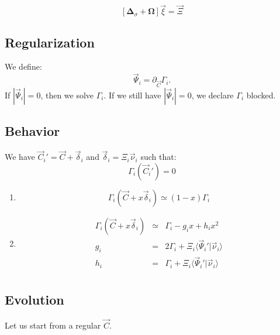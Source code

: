\documentclass[aps,12pt]{revtex4}
\begin{document}
\begin{equation}
	\left[ \bm{\Delta}_\sigma + \bm{\Omega} \right] \vec{\xi} = \vec{\Xi}
\end{equation}


\subsection{Regularization}
We define:
\begin{equation}
\vec{\Psi}_i = \partial_{\vec{C}} \Gamma_i.
\end{equation}
If $|\vec{\Psi}_i|=0$, then we solve $\Gamma_i$. If we still have $|\vec{\Psi}_i|=0$, we declare $\Gamma_i$ blocked.

\subsection{Behavior}
We have $\vec{C}_i'=\vec{C} + \vec{\delta}_i$ and $\vec{\delta}_i = \Xi_i \vec{\nu}_i$ such that:
\begin{equation}
	\Gamma_i(\vec{C}_i') = 0
\end{equation}

\begin{enumerate}
\item
\begin{equation}
	\Gamma_i(\vec{C} + x \vec{\delta}_i) \simeq (1-x) \Gamma_i
\end{equation}

\item
\begin{equation}
\begin{array}{rcl}
	\Gamma_i(\vec{C} + x  \vec{\delta}_i) & \simeq & \Gamma_i -g_i x + h_i x^2\\
	g_i & = & 2\Gamma_i + \Xi_i \langle\vec{\Psi}_i'  \vert \vec{\nu}_i \rangle\\
	h_i & = & \Gamma_i + \Xi_i \langle\vec{\Psi}_i'  \vert \vec{\nu}_i \rangle\\
\end{array}
\end{equation}

\end{enumerate}
 

 
\subsection{Evolution}
Let us start from a regular $\vec{C}$.
\end{document}
